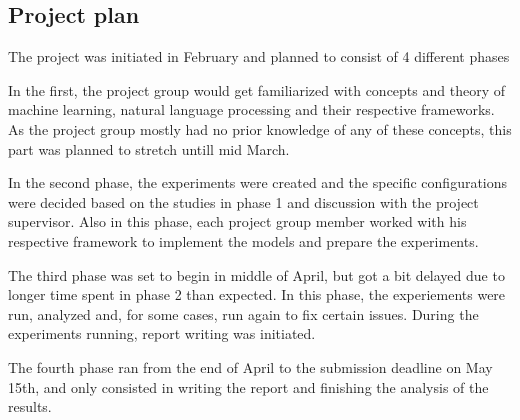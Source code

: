 \subsection{Project plan}

The project was initiated in February and planned to consist of 4 different
phases

In the first, the project group would get familiarized with concepts and theory
of machine learning, natural language processing and their respective
frameworks. As the project group mostly had no prior knowledge of any of these
concepts, this part was planned to stretch untill mid March.

In the second phase, the experiments were created and the specific
configurations were decided based on the studies in phase 1 and discussion with
the project supervisor. Also in this phase, each project group member worked
with his respective framework to implement the models and prepare the
experiments.

The third phase was set to begin in middle of April, but got a bit delayed due
to longer time spent in phase 2 than expected. In this phase, the experiements
were run, analyzed and, for some cases, run again to fix certain issues. During
the experiments running, report writing was initiated.

The fourth phase ran from the end of April to the submission deadline on May
15th, and only consisted in writing the report and finishing the analysis of the
results.

\pagebreak
